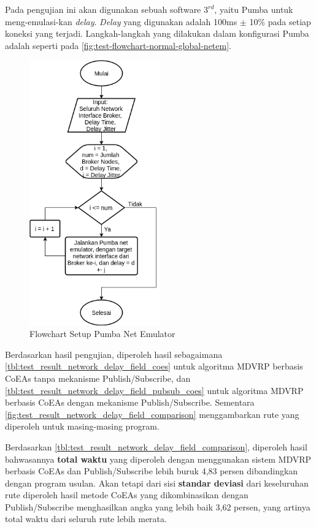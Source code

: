 Pada pengujian ini akan digunakan sebuah software \textit{$3^{rd}$}, yaitu Pumba \citep{1013821358660176_pumba_2016} untuk meng-emulasi-kan \textit{delay}. \textit{Delay} yang digunakan adalah 100ms $\pm$ 10\% pada setiap koneksi yang terjadi. Langkah-langkah yang dilakukan dalam konfigurasi Pumba adalah seperti pada \autoref{fig:test-flowchart-normal-global-netem}.


\begin{figure}[!]
	\centering
	\includegraphics[width=0.5\textwidth]{Resources/Images/test-flowchart-normal-global-netem}
	\caption{Flowchart Setup Pumba Net Emulator}
	\label{fig:test-flowchart-normal-global-netem}
\end{figure}


Berdasarkan hasil pengujian, diperoleh hasil sebagaimana \autoref{tbl:test_result_network_delay_field_coes} untuk algoritma MDVRP berbasis CoEAs tanpa mekanisme Publish/Subscribe, dan \autoref{tbl:test_result_network_delay_field_pubsub_coes} untuk algoritma MDVRP berbasis CoEAs dengan mekanisme Publish/Subscribe. Sementara \autoref{fig:test_result_network_delay_field_comparison} menggambarkan rute yang diperoleh untuk masing-masing program.


Berdasarkan \autoref{tbl:test_result_network_delay_field_comparison}, diperoleh hasil bahwasannya \textbf{total waktu} yang diperoleh dengan menggunakan sistem MDVRP berbasis CoEAs dan Publish/Subscribe lebih buruk 4,83 persen  dibandingkan dengan program usulan. Akan tetapi dari sisi \textbf{standar deviasi} dari keseluruhan rute diperoleh hasil metode CoEAs yang dikombinasikan dengan Publish/Subscribe menghasilkan angka yang lebih baik 3,62 persen, yang artinya total waktu dari seluruh rute lebih merata.



